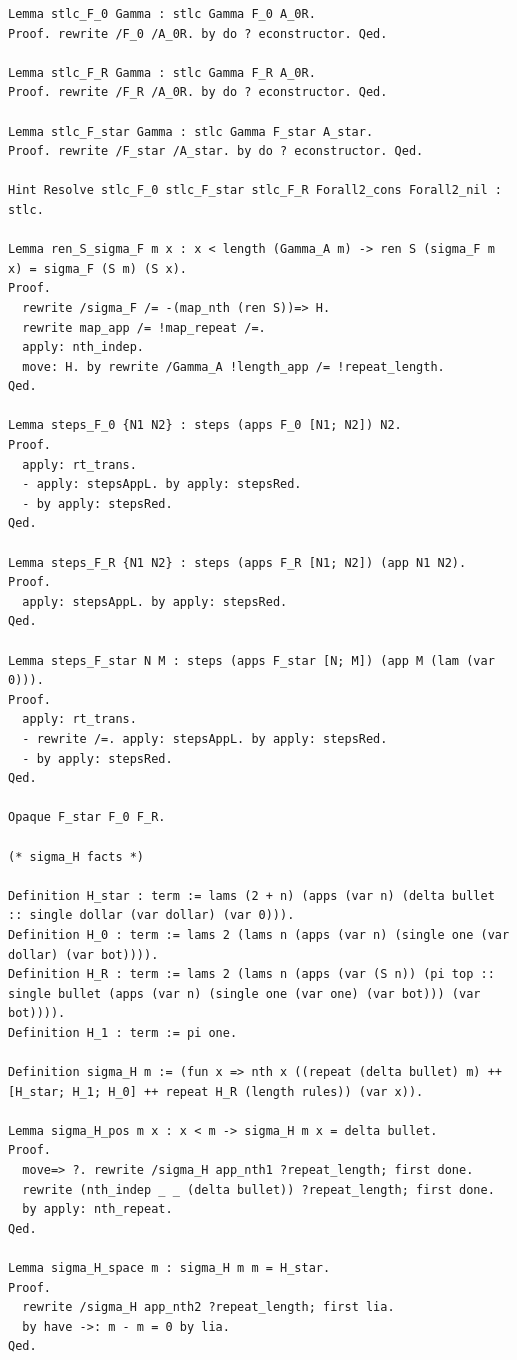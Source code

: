 \documentclass[10pt,a4paper]{amsart}
\begin{document}
\begin{lstlisting}
Lemma stlc_F_0 Gamma : stlc Gamma F_0 A_0R.
Proof. rewrite /F_0 /A_0R. by do ? econstructor. Qed.

Lemma stlc_F_R Gamma : stlc Gamma F_R A_0R.
Proof. rewrite /F_R /A_0R. by do ? econstructor. Qed.

Lemma stlc_F_star Gamma : stlc Gamma F_star A_star.
Proof. rewrite /F_star /A_star. by do ? econstructor. Qed.

Hint Resolve stlc_F_0 stlc_F_star stlc_F_R Forall2_cons Forall2_nil : stlc.

Lemma ren_S_sigma_F m x : x < length (Gamma_A m) -> ren S (sigma_F m x) = sigma_F (S m) (S x).
Proof.
  rewrite /sigma_F /= -(map_nth (ren S))=> H.
  rewrite map_app /= !map_repeat /=.
  apply: nth_indep.
  move: H. by rewrite /Gamma_A !length_app /= !repeat_length.
Qed.

Lemma steps_F_0 {N1 N2} : steps (apps F_0 [N1; N2]) N2.
Proof.
  apply: rt_trans.
  - apply: stepsAppL. by apply: stepsRed.
  - by apply: stepsRed.
Qed.

Lemma steps_F_R {N1 N2} : steps (apps F_R [N1; N2]) (app N1 N2).
Proof.
  apply: stepsAppL. by apply: stepsRed.
Qed.

Lemma steps_F_star N M : steps (apps F_star [N; M]) (app M (lam (var 0))).
Proof.
  apply: rt_trans.
  - rewrite /=. apply: stepsAppL. by apply: stepsRed.
  - by apply: stepsRed.
Qed.

Opaque F_star F_0 F_R.

(* sigma_H facts *)

Definition H_star : term := lams (2 + n) (apps (var n) (delta bullet :: single dollar (var dollar) (var 0))).
Definition H_0 : term := lams 2 (lams n (apps (var n) (single one (var dollar) (var bot)))).
Definition H_R : term := lams 2 (lams n (apps (var (S n)) (pi top :: single bullet (apps (var n) (single one (var one) (var bot))) (var bot)))).
Definition H_1 : term := pi one.

Definition sigma_H m := (fun x => nth x ((repeat (delta bullet) m) ++ [H_star; H_1; H_0] ++ repeat H_R (length rules)) (var x)).

Lemma sigma_H_pos m x : x < m -> sigma_H m x = delta bullet.
Proof.
  move=> ?. rewrite /sigma_H app_nth1 ?repeat_length; first done.
  rewrite (nth_indep _ _ (delta bullet)) ?repeat_length; first done.
  by apply: nth_repeat.
Qed.

Lemma sigma_H_space m : sigma_H m m = H_star.
Proof.
  rewrite /sigma_H app_nth2 ?repeat_length; first lia.
  by have ->: m - m = 0 by lia.
Qed.


\end{lstlisting}
\end{document}
